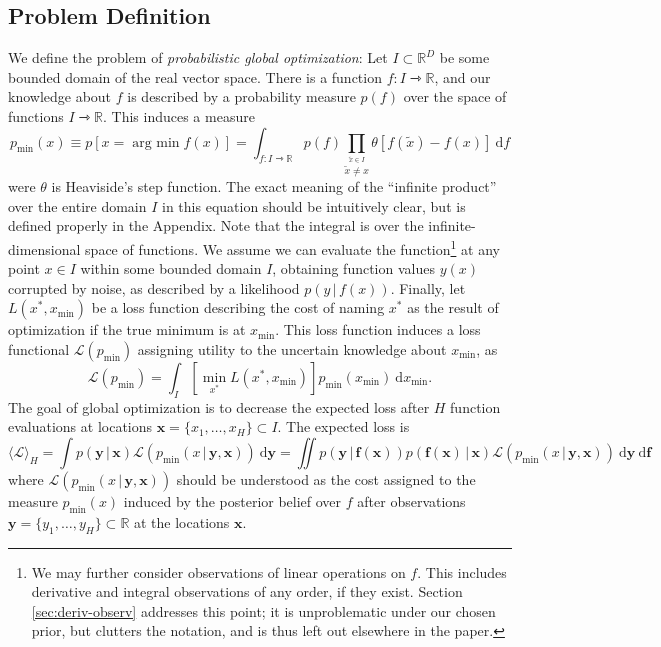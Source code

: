 \documentclass[twoside,11pt]{article}
\renewcommand{\Re}{\mathbb{R}}
\renewcommand{\L}{\mathcal{L}}
\newcommand{\g}{\,|\,}
\renewcommand{\d}{\:\mathrm{d}}
\newcommand{\vx}{\vec{x}}
\newcommand{\vy}{\vec{y}}
\newcommand{\xmin}{x_{\min}}
\newcommand{\pmin}{p_{\min}}
\renewcommand{\vec}{\boldsymbol}
\newcommand{\argmin}{\operatorname*{arg\: min}}
\renewcommand{\to}{\rightarrowtriangle}
\begin{document}
\subsection{Problem Definition}
\label{sec:problem-definition}
We define the problem of \emph{probabilistic global optimization}: Let
$I\subset\Re^D$ be some bounded domain of the real vector space. There
is a function $f:I\to\Re$, and our knowledge about $f$ is described by
a probability measure $p(f)$ over the space of functions
$I\to\Re$. This induces a measure
\begin{equation}
  \label{eq:1}
  \pmin(x) \equiv p[x=\argmin f(x)] = \int_{f:I\to\Re} p(f)
  \prod_{\stackrel{\tilde{x}\in I}{\tilde{x} \neq
      x}} \theta[f(\tilde{x})-f(x)] \d f
\end{equation}
were $\theta$ is Heaviside's step function. The exact meaning of the
``infinite product'' over the entire domain $I$ in this equation
should be intuitively clear, but is defined properly in the
Appendix. Note that the integral is over the infinite-dimensional
space of functions. We assume we can evaluate the function\footnote{We
  may further consider observations of linear operations on $f$. This
  includes derivative and integral observations of any order, if they
  exist. Section \ref{sec:deriv-observ} addresses this point; it is
  unproblematic under our chosen prior, but clutters the notation, and
  is thus left out elsewhere in the paper.} at any point $x\in I$
within some bounded domain $I$, obtaining function values $y(x)$
corrupted by noise, as described by a likelihood $p(y\g
f(x))$. Finally, let $L(x^*,\xmin)$ be a loss function describing the
cost of naming $x^*$ as the result of optimization if the true minimum
is at $\xmin$. This loss function induces a loss functional
$\L(\pmin)$ assigning utility to the uncertain knowledge about
$\xmin$, as
\begin{equation}
  \label{eq:3}
  \L(\pmin) = \int_I [\min_{x^*} L(x^*,\xmin)] \pmin(\xmin) \d \xmin.
\end{equation}
The goal of global optimization is to decrease the expected loss after
$H$ function evaluations at locations $\vx=\{x_1,\dots,x_H\}\subset
I$. The expected loss is
\begin{equation}
  \label{eq:2}
  \langle \L \rangle_H = \int p(\vy \g \vx) \L(\pmin(x \g \vy,\vx))
  \d \vy =  \iint p(\vy \g \vec{f}(\vx)) p(\vec{f}(\vx)\g\vx) \L(\pmin(x \g \vy,\vx))
  \d \vy \d \vec{f}
\end{equation}
where $\L(\pmin(x \g \vy,\vx))$ should be understood as the cost
assigned to the measure $\pmin(x)$ induced by the posterior belief
over $f$ after observations $\vy=\{y_1,\dots,y_H\}\subset\Re$ at the
locations $\vx$.
\end{document}

